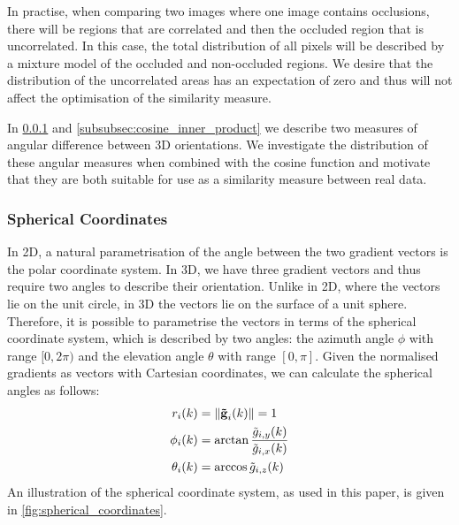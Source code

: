 In practise, when comparing two images where one image contains occlusions,
there will be regions that are correlated and then the occluded region that is
uncorrelated. In this case, the total distribution of all pixels will be
described by a mixture model of the occluded and non-occluded regions. We desire
that the distribution of the uncorrelated areas has an expectation of zero and
thus will not affect the optimisation of the similarity measure.

In \cref{subsubsec:cosine_spherical} and
\cref{subsubsec:cosine_inner_product} we describe two measures of angular
difference between 3D orientations. We investigate the distribution of these 
angular measures when combined with the cosine function and motivate that they 
are both suitable for use as a similarity measure between real data.
\subsubsection{Spherical Coordinates}\label{subsubsec:cosine_spherical}
In 2D, a natural parametrisation of the angle between the two gradient vectors
is the polar coordinate system. In 3D, we have three gradient vectors and thus
require two angles to describe their orientation. Unlike in 2D, where the
vectors lie on the unit circle, in 3D the vectors lie on the surface of a unit
sphere. Therefore, it is possible to parametrise the vectors in terms of the
spherical coordinate system, which is described by two angles: the azimuth angle
$\phi$ with range $[0, 2\pi)$ and the elevation angle $\theta$ with range
$[0, \pi]$. Given the normalised gradients as vectors with Cartesian
coordinates, we can calculate the spherical angles as follows:
\begin{equation}\label{eq:cartesian_to_spherical}
    \begin{aligned}
        r_i(k)      &= \lVert \boldsymbol{\mathbf{\tilde{g}}}_{i}(k) \rVert = 1            \\
        \phi_i(k)   &= \arctan{\frac{\tilde{g}_{i,y}(k)}{\tilde{g}_{i,x}(k)}} \\
        \theta_i(k) &= \arccos{\tilde{g}_{i,z}(k)}
    \end{aligned}
\end{equation}
An illustration of the spherical coordinate system, as used in this paper, is
given in \cref{fig:spherical_coordinates}.

